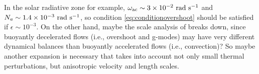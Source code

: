\documentclass[12pt]{article}
\begin{document}
In the solar radiative zone for example, $\omega_{\rm ac}\sim\sn{3}{-2}\ \rm rad\ s^{-1}$ and $N_a\sim 1.4\times10^{-3}\ \rm rad\ s^{-1}$, so condition \eqref{eq:conditionovershoot} should be satisfied if $\epsilon \sim 10^{-3}$. On the other hand, maybe the scale analysis of \citet{Gough1969} breaks down, since buoyantly decelerated flows (i.e., overshoot and g-modes) may have very different dynamical balances than buoyantly accelerated flows (i.e., convection)? So maybe another expansion is necessary that takes into account not only small thermal perturbations, but anisotropic velocity and length scales. 

	\newpage
		
\end{document}
